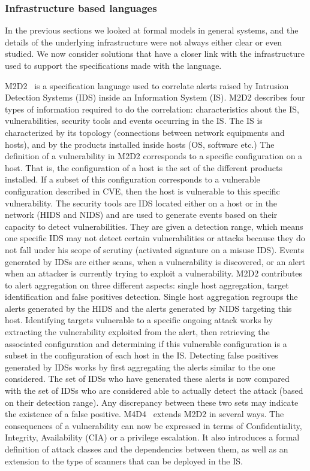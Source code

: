 \subsubsection{Infrastructure based languages}
In the previous sections we looked at formal models in general systems, and the details of the underlying infrastructure were not always either clear or even studied. We now consider solutions that have a closer link with the infrastructure used to support the specifications made with the language.

M2D2~\cite{M2D2-Morin2002} is a specification language used to correlate alerts raised by Intrusion Detection Systems (IDS) inside an Information System (IS).
M2D2 describes four types of information required to do the correlation: characteristics about the IS, vulnerabilities, security tools and events occurring in the IS.
The IS is characterized by its topology (connections between network equipments and hosts), and by the products installed inside hosts (\eg OS, software etc.)
The definition of a vulnerability in M2D2 corresponds to a specific configuration on a host.
That is, the configuration of a host is the set of the different products installed.
If a subset of this configuration corresponds to a vulnerable configuration described in CVE, then the host is vulnerable to this specific vulnerability.
The security tools are IDS located either on a host or in the network (HIDS and NIDS) and are used to generate events based on their capacity to detect vulnerabilities.
They are given a detection range, which means one specific IDS may not detect certain vulnerabilities or attacks because they do not fall under his scope of scrutiny (\eg activated signature on a misuse IDS).
Events generated by IDSs are either scans, when a vulnerability is discovered, or an alert when an attacker is currently trying to exploit a vulnerability.
M2D2 contributes to alert aggregation on three different aspects: single host aggregation, target identification and false positives detection.
Single host aggregation regroups the alerts generated by the HIDS and the alerts generated by NIDS targeting this host.
Identifying targets vulnerable to a specific ongoing attack works by extracting the vulnerability exploited from the alert, then retrieving the associated configuration and determining if this vulnerable configuration is a subset in the configuration of each host in the IS.
Detecting false positives generated by IDSs works by first aggregating the alerts similar to the one considered.
The set of IDSs who have generated these alerts is now compared with the set of IDSs who are considered able to actually detect the attack (based on their detection range).
Any discrepancy between these two sets may indicate the existence of a false positive.
M4D4~\cite{M4D4-Morin2008} extends M2D2 in several ways. The consequences of a vulnerability can now be expressed in terms of Confidentiality, Integrity, Availability (CIA) or a privilege escalation.
It also introduces a formal definition of attack classes and the dependencies between them, as well as an extension to the type of scanners that can be deployed in the IS.

